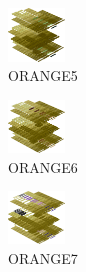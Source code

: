 \hspace{0.1cm}
\begin{minipage}[b]{0.15\linewidth}
\begin{figure}[H]                                                          
  \centering                                                             
  \begin{adjustbox}{width=1.5cm,center}                                   
  \includegraphics[width=1.5cm]{src/colorspace_colourflow/flows/colourflow_245-45.png}%
  \end{adjustbox}                                                        
\caption*{ORANGE5}                                           
\end{figure}                                                               
\end{minipage}
\hspace{0.1cm}
\begin{minipage}[b]{0.15\linewidth}
\begin{figure}[H]                                                          
  \centering                                                             
  \begin{adjustbox}{width=1.5cm,center}                                   
  \includegraphics[width=1.5cm]{src/colorspace_colourflow/flows/colourflow_246-45.png}%
  \end{adjustbox}                                                        
\caption*{ORANGE6}                                           
\end{figure}                                                               
\end{minipage}
\hspace{0.1cm}
\begin{minipage}[b]{0.15\linewidth}
\begin{figure}[H]                                                          
  \centering                                                             
  \begin{adjustbox}{width=1.5cm,center}                                   
  \includegraphics[width=1.5cm]{src/colorspace_colourflow/flows/colourflow_247-45.png}%
  \end{adjustbox}                                                        
\caption*{ORANGE7}                                           
\end{figure}                                                               
\end{minipage}
